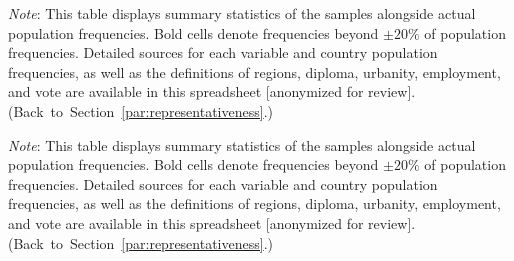 %         

\begin{table}[h!]
    \caption[Sample representativeness in FR, DE, IT]{Sample representativeness in France, Germany, Italy. %
    } \label{tab:representativeness_1}
    \makebox[\textwidth][c]{
        \resizebox*{!}{.60\textheight}{%
        
        }
    }
    {\footnotesize \textit{Note}: This table displays summary statistics of the samples alongside actual population frequencies. Bold cells denote frequencies beyond $\pm 20\%$ of population frequencies. 
    Detailed sources for each variable and country population frequencies, as well as the definitions of regions, diploma, urbanity, employment, and vote are available in this spreadsheet [anonymized for review].  \hfill (Back~to~Section~\ref{par:representativeness}.) %
    } 
\end{table}

\begin{table}[h!]
    \caption[Sample representativeness in PL, ES, GB, CH]{Sample representativeness in Poland, Spain, the UK, Switzerland. %
    } \label{tab:representativeness_2}
    \makebox[\textwidth][c]{\resizebox*{!}{.60\textheight}{}}
    {\footnotesize \textit{Note}: This table displays summary statistics of the samples alongside actual population frequencies. Bold cells denote frequencies beyond $\pm 20\%$ of population frequencies. 
    Detailed sources for each variable and country population frequencies, as well as the definitions of regions, diploma, urbanity, employment, and vote are available in this spreadsheet [anonymized for review].  \hfill (Back~to~Section~\ref{par:representativeness}.) %
    } 
\end{table}

